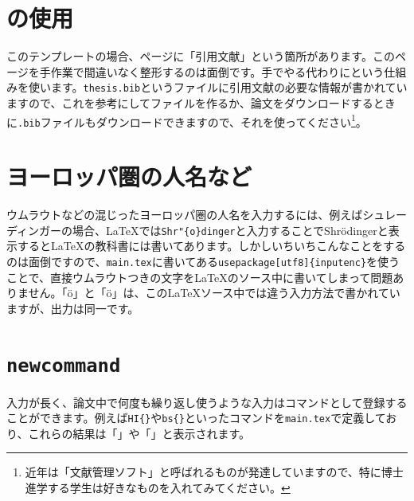 \section{\BibTeX{}の使用}
このテンプレートの場合、\pageref{page:bib}ページに「引用文献」という箇所があります。このページを手作業で間違いなく整形するのは面倒です。手でやる代わりに\BibTeX{}という仕組みを使います。\texttt{thesis.bib}というファイルに引用文献の必要な情報が書かれていますので、これを参考にして\BibTeX{}ファイルを作るか、論文をダウンロードするときに\texttt{.bib}ファイルもダウンロードできますので、それを使ってください\footnote{近年は「文献管理ソフト」と呼ばれるものが発達していますので、特に博士進学する学生は好きなものを入れてみてください。}。

\section{ヨーロッパ圏の人名など}
ウムラウトなどの混じったヨーロッパ圏の人名を入力するには、例えばシュレーディンガーの場合、\LaTeX{}では\texttt{Shr\bs{}"\{o\}dinger}と入力することでShr\"{o}dingerと表示すると\LaTeX{}の教科書には書いてあります。しかしいちいちこんなことをするのは面倒ですので、\texttt{main.tex}に書いてある\texttt{\bs{}usepackage[utf8]\{inputenc\}}を使うことで、直接ウムラウトつきの文字を\LaTeX{}のソース中に書いてしまって問題ありません。「ö」と「\"{o}」は、この\LaTeX{}ソース中では違う入力方法で書かれていますが、出力は同一です。

\section{\texttt{newcommand}}

入力が長く、論文中で何度も繰り返し使うような入力はコマンドとして登録することができます。例えば\texttt{\bs{}HI\{\}}や\texttt{\bs{}bs\{\}}といったコマンドを\texttt{main.tex}で定義しており、これらの結果は「\HI{}」や「\bs{}」と表示されます。
